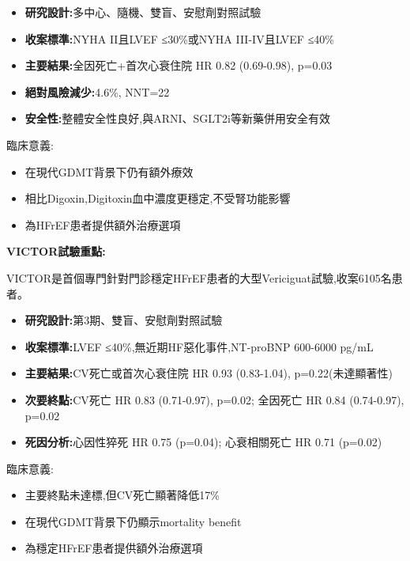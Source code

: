\documentclass[12pt,a4paper]{article}
\begin{document}
\begin{itemize}[nosep]
    \item \textbf{研究設計:}多中心、隨機、雙盲、安慰劑對照試驗
    \item \textbf{收案標準:}NYHA II且LVEF ≤30\%或NYHA III-IV且LVEF ≤40\%
    \item \textbf{主要結果:}全因死亡+首次心衰住院 HR 0.82 (0.69-0.98), p=0.03
    \item \textbf{絕對風險減少:}4.6\%, NNT=22
    \item \textbf{安全性:}整體安全性良好,與ARNI、SGLT2i等新藥併用安全有效
\end{itemize}

臨床意義:
\begin{itemize}[nosep]
    \item 在現代GDMT背景下仍有額外療效
    \item 相比Digoxin,Digitoxin血中濃度更穩定,不受腎功能影響
    \item 為HFrEF患者提供額外治療選項
\end{itemize}

\vspace{0.5cm}

\textbf{VICTOR試驗重點:}

VICTOR是首個專門針對門診穩定HFrEF患者的大型Vericiguat試驗,收案6105名患者。

\begin{itemize}[nosep]
    \item \textbf{研究設計:}第3期、雙盲、安慰劑對照試驗
    \item \textbf{收案標準:}LVEF ≤40\%,無近期HF惡化事件,NT-proBNP 600-6000 pg/mL
    \item \textbf{主要結果:}CV死亡或首次心衰住院 HR 0.93 (0.83-1.04), p=0.22(未達顯著性)
    \item \textbf{次要終點:}CV死亡 HR 0.83 (0.71-0.97), p=0.02; 全因死亡 HR 0.84 (0.74-0.97), p=0.02
    \item \textbf{死因分析:}心因性猝死 HR 0.75 (p=0.04); 心衰相關死亡 HR 0.71 (p=0.02)
\end{itemize}

臨床意義:
\begin{itemize}[nosep]
    \item 主要終點未達標,但CV死亡顯著降低17\%
    \item 在現代GDMT背景下仍顯示mortality benefit
    \item 為穩定HFrEF患者提供額外治療選項
\end{itemize}

\vspace{0.5cm}
\end{document}
